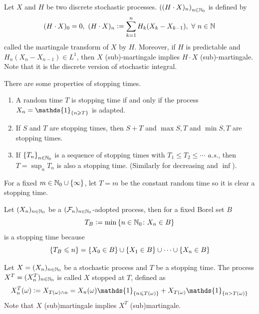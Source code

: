\documentclass[a4paper,12pt]{article}
\begin{document}
\begin{itemize}
  \noindent Let $X$ and $H$ be two discrete stochastic processes. $\left((H\cdot X)_n\right)_{n\in \mathbb{N}_0}$ is defined by
  \begin{equation*}
    (H\cdot X)_0 = 0,~(H\cdot X)_n \vcentcolon= \sum_{k=1}^nH_k(X_k-X_{k-1}),~\forall~n\in \mathbb{N}
  \end{equation*}
  called the martingale transform of $X$ by $H$. Moreover, if $H$ is predictable and $H_n(X_n-X_{n-1}) \in L^1$, then $X$ (sub)-martingale implies $H\cdot X$ (sub)-martingale. Note that it is the discrete version of stochastic integral.

  \noindent There are some properties of stopping times.
  \begin{enumerate}[label=(\arabic*)]
    \item A random time $T$ is stopping time if and only if the process $X_n = \mathds{1}_{\bb{n \geqslant T}}$ is adapted.
    \item If $S$ and $T$ are stopping times, then $S+T$ and $\max{S,T}$ and $\min{S,T}$ are stopping times.
    \item If $\left\{T_n\right\}_{n\in \mathbb{N}_0}$ is a sequence of stopping times with $T_1 \leqslant T_2 \leqslant \cdots$ \emph{a.s.}, then $T = \sup_n T_n$ is also a stopping time. (Similarly for decreasing and $\inf$).
  \end{enumerate}

  \begin{exam}
    \item For a fixed $m \in \mathbb{N}_0 \cup \left\{\infty\right\}$, let $T = m$ be the constant random time so it is clear a stopping time.
    \item Let $(X_n)_{n \in \mathbb{N}_0}$ be a $(\mathcal{F}_n)_{n \in \mathbb{N}_0}$-adopted process, then for a fixed Borel set $B$ 
    \begin{equation*}
      T_B \vcentcolon= \min\left\{n \in \mathbb{N}_0 \colon X_n \in B\right\}
    \end{equation*}
    is a stopping time because
    \begin{equation*}
      \left\{T_B \leqslant n\right\} = \left\{X_0 \in B\right\} \cup \left\{X_1 \in B\right\} \cup \cdots \cup \left\{X_n \in B\right\}
    \end{equation*}
  \end{exam}

  \noindent Let $X=(X_n)_{n\in \mathbb{N}_0}$ be a stochastic process and $T$ be a stopping time. The process $X^T=(X_n^T)_{n\in \mathbb{N}_0}$ is called $X$ stopped at $T$, defined as
  \begin{equation*}
    X^T_n(\omega) \defeq X_{T(\omega)\wedge n} = X_n(\omega)\mathds{1}_{\bb{n \leqslant T(\omega)}} +  X_{T(\omega)}\mathds{1}_{\bb{n > T(\omega)}}
  \end{equation*}
  Note that $X$ (sub)martingale implies $X^T$ (sub)martingale.


\end{itemize}
\end{document}
